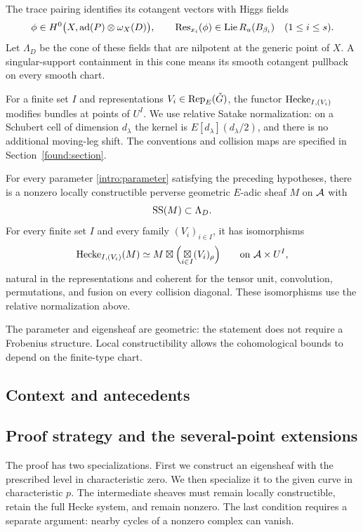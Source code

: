 The trace pairing identifies its cotangent vectors with Higgs fields
\begin{equation}\label{intro:cotangent}
 \phi\in H^0\bigl(X,\operatorname{ad}(P)\otimes\omega_X(D)\bigr),
 \qquad \operatorname{Res}_{x_i}(\phi)\in\operatorname{Lie} R_u(B_{\beta_i})
 \quad(1\le i\le s).
\end{equation}
Let $\Lambda_D$ be the cone of these fields that are nilpotent at the generic point of $X$. A singular-support containment in this cone means its smooth cotangent pullback on every smooth chart.

For a finite set $I$ and representations $V_i\in\operatorname{Rep}_E(\check G)$, the functor $\operatorname{Hecke}_{I,(V_i)}$ modifies bundles at points of $U^I$. We use relative Satake normalization: on a Schubert cell of dimension $d_\lambda$ the kernel is $E[d_\lambda](d_\lambda/2)$, and there is no additional moving-leg shift. The conventions and collision maps are specified in Section~\ref{found:section}.

\begin{theorem}\label{intro:main}
For every parameter \eqref{intro:parameter} satisfying the preceding hypotheses, there is a nonzero locally constructible perverse geometric $E$-adic sheaf $M$ on $\mathcal A$ with
\[
 \operatorname{SS}(M)\subset\Lambda_D.
\]
For every finite set $I$ and every family $(V_i)_{i\in I}$, it has isomorphisms
\begin{equation}\label{intro:eigen}
 \operatorname{Hecke}_{I,(V_i)}(M)
 \simeq M\boxtimes\Bigl(\mathop{\boxtimes}_{i\in I}(V_i)_\rho\Bigr)
 \qquad\text{on }\mathcal A\times U^I,
\end{equation}
natural in the representations and coherent for the tensor unit, convolution, permutations, and fusion on every collision diagonal. These isomorphisms use the relative normalization above.
\end{theorem}

The parameter and eigensheaf are geometric: the statement does not require a Frobenius structure. Local constructibility allows the cohomological bounds to depend on the finite-type chart.

\subsection{Context and antecedents}


\subsection{Proof strategy and the several-point extensions}
The proof has two specializations. First we construct an eigensheaf with the prescribed level in characteristic zero. We then specialize it to the given curve in characteristic $p$. The intermediate sheaves must remain locally constructible, retain the full Hecke system, and remain nonzero. The last condition requires a separate argument: nearby cycles of a nonzero complex can vanish.

